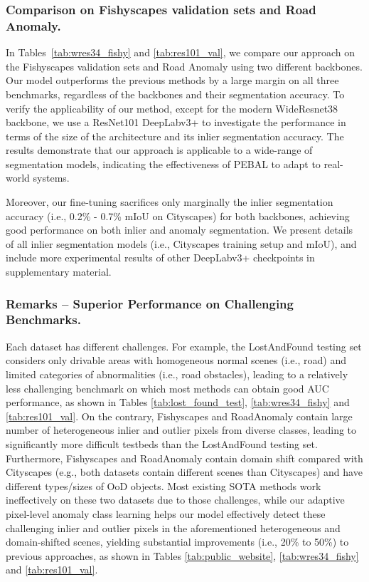\documentclass[runningheads]{llncs}
\begin{document}
\vspace{-10pt}
\subsubsection{Comparison on Fishyscapes validation sets and Road Anomaly.}
In Tables~\ref{tab:wres34_fishy} and \ref{tab:res101_val}, we compare our approach on the Fishyscapes validation sets and Road Anomaly using two different backbones. Our model outperforms the previous methods by a large margin on all three benchmarks, regardless of the backbones and their segmentation accuracy. 
To verify the applicability of our method, except for the modern WideResnet38 backbone,
we use a ResNet101 DeepLabv3+ 
to investigate the performance in terms of the size of the architecture and its inlier segmentation accuracy. The results demonstrate that our approach is applicable to a wide-range of segmentation models,
indicating the effectiveness of PEBAL to adapt to real-world systems. 

Moreover, our fine-tuning sacrifices only marginally the inlier segmentation accuracy (i.e., 0.2\% - 0.7\% mIoU on Cityscapes) for both backbones, achieving good performance on both inlier and anomaly segmentation. 
We present details of all inlier segmentation models (i.e., Cityscapes training setup and mIoU), and include more experimental results of other DeepLabv3+ checkpoints in supplementary material.


\vspace{-10pt}
\subsubsection{Remarks -- Superior Performance on Challenging Benchmarks.}
Each dataset has different challenges. For example, the LostAndFound testing set considers only drivable areas with homogeneous normal scenes  (i.e., road) and limited categories of abnormalities (i.e., road obstacles), leading to a relatively less challenging benchmark on which most methods can obtain  good AUC performance, as shown in Tables \ref{tab:lost_found_test}, \ref{tab:wres34_fishy} and \ref{tab:res101_val}. 
On the contrary, Fishyscapes and RoadAnomaly contain large number of heterogeneous inlier and outlier pixels from diverse classes, leading to significantly more difficult testbeds than the LostAndFound testing set. 
Furthermore,  Fishyscapes and RoadAnomaly contain domain shift compared with Cityscapes (e.g., both datasets contain different scenes than Cityscapes)
and have different types/sizes of OoD objects.
Most existing SOTA methods work ineffectively on these two datasets due to those challenges, while our adaptive pixel-level anomaly class learning helps our model effectively detect these challenging inlier and outlier pixels in the aforementioned heterogeneous and domain-shifted scenes, 
yielding substantial improvements (i.e., 20\% to 50\%) to previous approaches, as shown in Tables \ref{tab:public_website}, \ref{tab:wres34_fishy} and \ref{tab:res101_val}.
\end{document}
